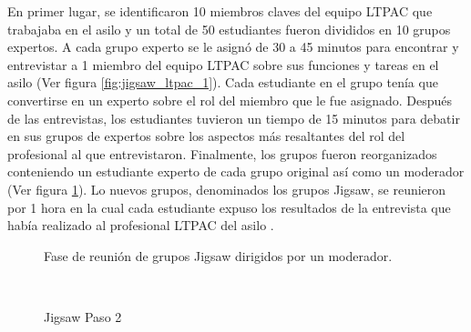 
En primer lugar, se identificaron 10 miembros claves del equipo LTPAC que trabajaba en el asilo y un total de 50 estudiantes fueron divididos en 10 grupos expertos. A cada grupo experto se le asignó de 30 a 45 minutos para encontrar y entrevistar a 1 miembro del equipo LTPAC sobre sus funciones y tareas en el asilo (Ver figura \ref{fig:jigsaw_ltpac_1}). Cada estudiante en el grupo tenía que convertirse en un experto sobre el rol del miembro que le fue asignado. Después de las entrevistas, los estudiantes tuvieron un tiempo de 15 minutos para debatir en sus grupos de expertos sobre los aspectos más resaltantes del rol del profesional al que entrevistaron. Finalmente, los grupos fueron reorganizados conteniendo un estudiante experto de cada grupo original así como un moderador (Ver figura \ref{fig:jigsaw_ltpac_2}). Lo nuevos grupos, denominados los grupos Jigsaw, se reunieron por 1 hora en la cual cada estudiante expuso los resultados de la entrevista que había realizado al profesional LTPAC del asilo \cite{Buhr2014429}.\\

\begin{figure}[!h]
  \centering

  \caption{Jigsaw Paso 2}{Fase de reunión de grupos Jigsaw dirigidos por un moderador.}
  
    \\
  \label{fig:jigsaw_ltpac_2}
\end{figure}

